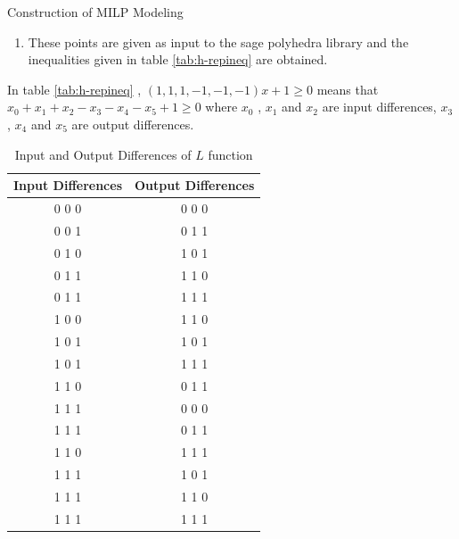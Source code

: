 \documentclass [version=final]{iacrcc}
\begin{document}
\begin{section}{Construction of MILP Modeling}
\begin{enumerate}
    \item These points are given as input to the sage polyhedra library and the inequalities given in table \ref{tab:h-repineq} are obtained.
    
\end{enumerate}

In table \ref{tab:h-repineq} ,  $(1, 1, 1, -1, -1, -1) x + 1 \geq 0$ means that $ x_0 + x_1 + x_2 -x_3 - x_4 -x_5 +1 \geq 0 $ where $x_0$ , $x_1$ and $x_2$ are input differences, $x_3$ , $x_4$ and $x_5$ are output differences.  

\begin{table}[h]
\centering
\begin{tabular}{|c|c|}
\hline
\textbf{Input Differences} & \textbf{Output Differences} \\ \hline
0 0 0 & 0 0 0 \\ \hline
0 0 1 & 0 1 1 \\ \hline
0 1 0 & 1 0 1 \\ \hline
0 1 1 & 1 1 0 \\ \hline
0 1 1 & 1 1 1 \\ \hline
1 0 0 & 1 1 0 \\ \hline
1 0 1 & 1 0 1 \\ \hline
1 0 1 & 1 1 1 \\ \hline
1 1 0 & 0 1 1 \\ \hline
1 1 1 & 0 0 0 \\ \hline
1 1 1 & 0 1 1 \\ \hline
1 1 0 & 1 1 1 \\ \hline
1 1 1 & 1 0 1 \\ \hline
1 1 1 & 1 1 0 \\ \hline
1 1 1 & 1 1 1 \\ \hline
\end{tabular}
\caption{Input and Output Differences of $L$ function}
\label{tab:hreptab}
\end{table}


\end{section}
\end{document}
